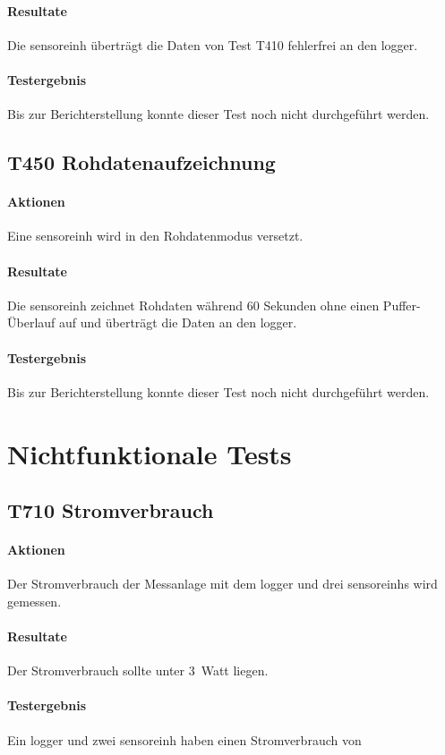 \paragraph{Resultate} Die \gls{sensoreinh} überträgt die Daten von Test T410 fehlerfrei an den \gls{logger}.

\paragraph{Testergebnis} Bis zur Berichterstellung konnte dieser Test noch nicht durchgeführt werden.

\subsection{T450 Rohdatenaufzeichnung}
\paragraph{Aktionen} Eine \gls{sensoreinh} wird in den Rohdatenmodus versetzt.

\paragraph{Resultate} Die \gls{sensoreinh} zeichnet Rohdaten während 60 Sekunden ohne einen Puffer-Überlauf auf und überträgt die Daten an den \gls{logger}.

\paragraph{Testergebnis} Bis zur Berichterstellung konnte dieser Test noch nicht durchgeführt werden.

\section{Nichtfunktionale Tests}
\subsection{T710 Stromverbrauch}
\paragraph{Aktionen} Der Stromverbrauch der Messanlage mit dem \gls{logger} und drei \glspl{sensoreinh} wird gemessen. 

\paragraph{Resultate} Der Stromverbrauch sollte unter 3~Watt liegen.

\paragraph{Testergebnis} Ein \gls{logger} und zwei \gls{sensoreinh} haben einen Stromverbrauch von 